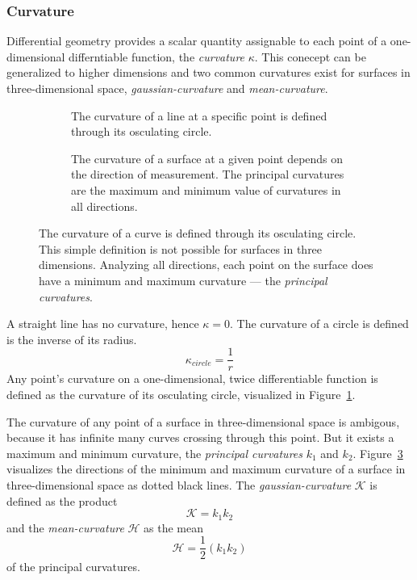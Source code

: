 \subsubsection{Curvature}

Differential geometry provides a scalar quantity\cite{Kuhnel2008} assignable to each point of a one-dimensional differntiable function, the \emph{curvature} $\kappa$.
This conecept can be generalized to higher dimensions and two common curvatures exist for surfaces in three-dimensional space, \emph{\gls{gaussian-curvature}} and \emph{\gls{mean-curvature}}.
\begin{figure}[H]
    \begin{subfigure}[t]{0.47\textwidth}
        \scalebox{0.9}{%
        
        }
        \caption{The curvature of a line at a specific point is defined through its osculating circle.}\label{fig:osculating_circle}
    \end{subfigure}
    \begin{subfigure}[t]{0.47\textwidth}
        \scalebox{0.9}{%
        
        }
        \caption[Visualization of curvature for curves and surfaces]{The curvature of a surface at a given point depends on the direction of measurement. The principal curvatures are the maximum and minimum value of curvatures in all directions.}\label{fig:curvature_surface}
    \end{subfigure}
    \caption[Curvature of Curves and Surfaces]{The curvature of a curve is defined through its osculating circle. This simple definition is not possible for surfaces in three dimensions. Analyzing all directions, each point on the surface does have a minimum and maximum curvature --- the \emph{principal curvatures}.}
\end{figure}
A straight line has no curvature, hence $\kappa = 0$.
The curvature of a circle is defined is the inverse of its radius.
\begin{equation}
    \kappa_{circle} = \frac{1}{r}
\end{equation}
Any point's curvature on a one-dimensional, twice differentiable function is defined as the curvature of its osculating circle, visualized in Figure~\ref{fig:osculating_circle}.

The curvature of any point of a surface in three-dimensional space is ambigous, because it has infinite many curves crossing through this point.
But it exists a maximum and minimum curvature, the \emph{principal curvatures} $k_1$ and $k_2$.
Figure~\ref{fig:curvature_surface} visualizes the directions of the minimum and maximum curvature of a surface in three-dimensional space as dotted black lines.
The \emph{\Gls{gaussian-curvature}} $\mathcal{K}$ is defined as the product
\[
    \mathcal{K} = k_1 k_2
\]
and the \emph{\Gls{mean-curvature}} $\mathcal{H}$ as the mean
\[
    \mathcal{H} = \frac{1}{2} (k_1 k_2)
\]
of the principal curvatures.

